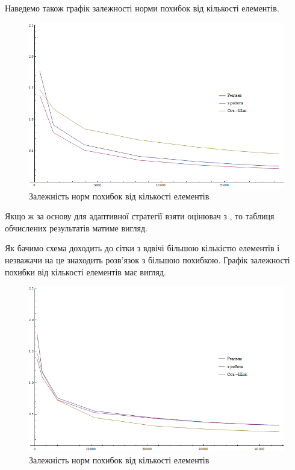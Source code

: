 Наведемо також графік залежності норми похибок від кількості елементів.

\begin{figure}[H]
	\centering
    \includegraphics[scale=0.65]{problem1/my/Plotnb}
    \caption{Залежність норм похибок від кількості елементів}
    \label{fig:p1_my_errors}
\end{figure}

Якщо ж за основу для адаптивної стратегії взяти оцінювач з \cite{OstShynAee11}, то таблиця обчислених результатів матиме вигляд.


Як бачимо схема доходить до сітки з вдвічі більшою кількістю елементів і незважачи на це знаходить розв'язок з більшою похибкою. Графік залежності похибки від кількості елементів має вигляд.


\begin{figure}[H]
	\centering
    \includegraphics[scale=0.65]{problem1/ost/Plotnb}
    \caption{Залежність норм похибок від кількості елементів}
    \label{fig:p1_ost_errors}
\end{figure}
